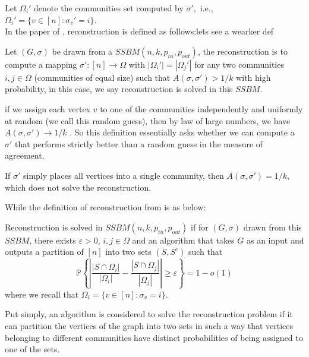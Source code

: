 Let $\Omega_i'$ denote the communities set computed by $\sigma',$ i.e., $\Omega_i'=\{v\in[n]: \sigma_v'=i\}.$\\
In the paper of \cite{TheSurvey} \cite{firstpaper}, reconstruction is defined as follows:\textcolor{Mahogany}{lets see a wearker def}
\begin{definition}\label{def: recover_1}
Let $(G, \sigma)$ be drawn from a $SSBM(n, k, p_{in}, p_{out})$, the reconstruction is to compute a mapping $\sigma': [n]\rightarrow \Omega$ with $|\Omega_i'|=|\Omega_j'|$ for any two communities $i, j\in\Omega$ (communities of equal size) such that $A(\sigma, \sigma')> 1/k$ \textcolor{Mahogany}{with high probability,} in this case, we say reconstruction is solved in this $SSBM$.
\end{definition}
\begin{remark}
    if we assign each vertex $v$ to one of the communities independently and uniformly at random (we call this random guess), then by law of large numbers, we have $A(\sigma, \sigma')\rightarrow 1/k$ \cite{TheSurvey}. So this definition essentially asks whether we can compute a $\sigma'$ that performs strictly better than a random guess in the measure of agreement.
\end{remark}
\begin{remark}
    If $\sigma'$ simply places all vertices into a single community, then $A(\sigma, \sigma')=1/k,$ which does not solve the reconstruction.
\end{remark}
While the definition of reconstruction from \cite{TheConjecture} is as below:
\begin{definition}\label{def: recover_2}
Reconstruction is solved in $SSBM(n, k, p_{in}, p_{out})$ if for $(G,\sigma)$ drawn from this $SSBM$, there exists $\varepsilon > 0$, $i,j \in\Omega$ and an algorithm that takes $G$ as an input and outputs a partition of $[n]$ into two sets $(S,S^c)$ such that\begin{equation}\label{equn:1.4}
    \mathbb{P}\left\{ \left| \frac{|S \cap \Omega_i|}{|\Omega_i|} - \frac{|S \cap \Omega_j|}{|\Omega_j|} \right| \geq \varepsilon \right\} = 1 - o(1)
\end{equation}
where we recall that $\Omega_i = \{ v\in [n] : \sigma_v = i \}.$
\end{definition}
\begin{remark}
    Put simply, an algorithm is considered to solve the reconstruction problem if it can partition the vertices of the graph into two sets in such a way that vertices belonging to different communities have distinct probabilities of being assigned to one of the sets. 
\end{remark}
